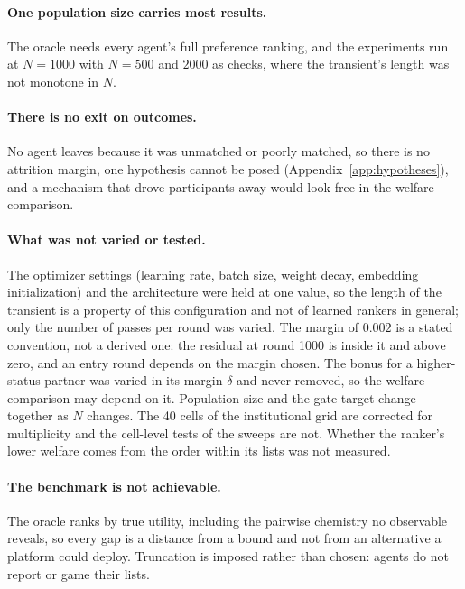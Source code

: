 \paragraph{One population size carries most results.} The oracle needs every
agent's full preference ranking, and the experiments run at $N = 1000$ with
$N = 500$ and $2000$ as checks, where the transient's length was not monotone in
$N$.

\paragraph{There is no exit on outcomes.} No agent leaves because it was
unmatched or poorly matched, so there is no attrition margin, one hypothesis cannot
be posed (Appendix~\ref{app:hypotheses}), and a mechanism that drove participants
away would look free in the welfare comparison.

\paragraph{What was not varied or tested.} The optimizer settings (learning rate,
batch size, weight decay, embedding initialization) and the architecture were held
at one value, so the length of the transient is a property of this configuration
and not of learned rankers in general; only the number of passes per round was
varied. The margin of $0.002$ is a stated convention, not a derived one: the
residual at round 1000 is inside it and above zero, and an entry round depends on
the margin chosen. The bonus for a higher-status partner was varied in its margin
$\delta$ and never removed, so the welfare comparison may depend on it. Population
size and the gate target change together as $N$ changes. The 40 cells of the
institutional grid are corrected for multiplicity and the cell-level tests of the
sweeps are not. Whether the ranker's lower welfare comes from the order within
its lists was not measured.

\paragraph{The benchmark is not achievable.} The oracle ranks by true utility,
including the pairwise chemistry no observable reveals, so every gap is a distance
from a bound and not from an alternative a platform could deploy. Truncation is
imposed rather than chosen: agents do not report or game their lists.
